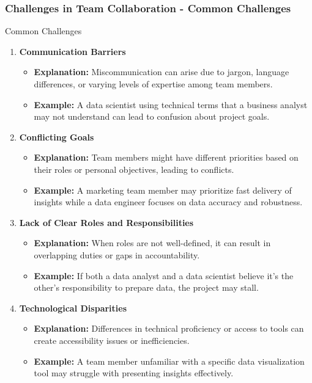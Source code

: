 \documentclass[aspectratio=169]{beamer}
\begin{document}
\begin{frame}[fragile]
    \frametitle{Challenges in Team Collaboration - Common Challenges}
    \begin{block}{Common Challenges}
        \begin{enumerate}
            \item \textbf{Communication Barriers}
                \begin{itemize}
                    \item \textbf{Explanation:} Miscommunication can arise due to jargon, language differences, or varying levels of expertise among team members.
                    \item \textbf{Example:} A data scientist using technical terms that a business analyst may not understand can lead to confusion about project goals.
                \end{itemize}

            \item \textbf{Conflicting Goals}
                \begin{itemize}
                    \item \textbf{Explanation:} Team members might have different priorities based on their roles or personal objectives, leading to conflicts.
                    \item \textbf{Example:} A marketing team member may prioritize fast delivery of insights while a data engineer focuses on data accuracy and robustness.
                \end{itemize}
                
            \item \textbf{Lack of Clear Roles and Responsibilities}
                \begin{itemize}
                    \item \textbf{Explanation:} When roles are not well-defined, it can result in overlapping duties or gaps in accountability.
                    \item \textbf{Example:} If both a data analyst and a data scientist believe it’s the other’s responsibility to prepare data, the project may stall.
                \end{itemize}

            \item \textbf{Technological Disparities}
                \begin{itemize}
                    \item \textbf{Explanation:} Differences in technical proficiency or access to tools can create accessibility issues or inefficiencies.
                    \item \textbf{Example:} A team member unfamiliar with a specific data visualization tool may struggle with presenting insights effectively.
                \end{itemize}


\end{enumerate}
\end{block}
\end{frame}
\end{document}
